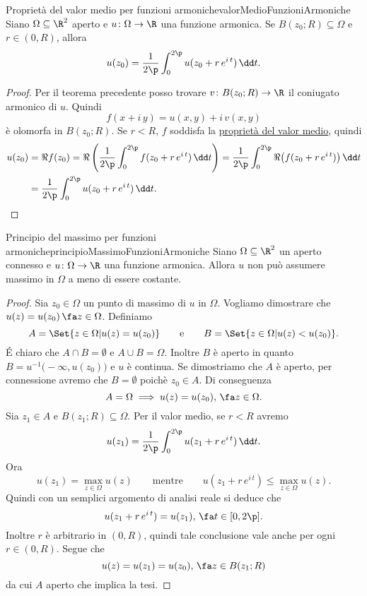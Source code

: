 \begin{prop}{Proprietà del valor medio per funzioni armoniche}{valorMedioFunzioniArmoniche}
	Siano \(\Omega\subseteq\R^2\) aperto e \(u\colon \Omega \to \R\) una funzione armonica.
	Se \(B(z_0;R)\subseteq\Omega\) e \(r\in (0,R)\), allora
	\[
		u(z_0) = \frac{1}{2\p} \int_0^{2\p} u(z_0+r\,e^{i\,t})\,\dd t.
	\]
\end{prop}

\begin{proof}
	Per il teorema precedente posso trovare \(v\colon B(z_0;R) \to \R\) il coniugato armonico di \(u\). Quindi
	\[
		f(x+i\,y) = u(x,y) + i\,v(x,y)
	\]
	è olomorfa in \(B(z_0;R)\). Se \(r<R\), \(f\) soddisfa la \hyperref[th:valorMedio]{proprietà del valor medio}, quindi
	\[
		\begin{split}
			u(z_0) & = \Re f(z_0) = \Re \left( \frac{1}{2\p} \int_0^{2\p} f(z_0+r\,e^{i\,t})\,\dd t \right) = \frac{1}{2\p}\int_0^{2\p} \Re\big(f(z_0+r\,e^{i\,t})\big)\,\dd t\\
			& = \frac{1}{2\p} \int_0^{2\p} u(z_0 + r\,e^{i\,t})\,\dd t.\qedhere
		\end{split}
	\]
\end{proof}

\begin{prop}{Principio del massimo per funzioni armoniche}{principioMassimoFunzioniArmoniche}
	Siano \(\Omega\subseteq\R^2\) un aperto connesso e \(u\colon \Omega \to \R\) una funzione armonica.
	Allora \(u\) non può assumere massimo in \(\Omega\) a meno di essere costante.
\end{prop}

\begin{proof}
	Sia \(z_0\in\Omega\) un punto di massimo di \(u\) in \(\Omega\). Vogliamo dimostrare che \(u(z)=u(z_0)\,\fa z\in\Omega\).
	Definiamo
	\[
		A = \Set{z\in\Omega | u(z)=u(z_0)} \qquad\text{e}\qquad B=\Set{z\in\Omega | u(z)<u(z_0)}.
	\]
	\'E chiaro che \(A\cap B = \emptyset\) e \(A\cup B=\Omega\).
	Inoltre \(B\) è aperto in quanto \(B=u^{-1}\big(-\infty,u(z_0)\big)\) e \(u\) è continua.
	Se dimostriamo che \(A\) è aperto, per connessione avremo che \(B=\emptyset\) poichè \(z_0\in A\). Di conseguenza
	\[
		A = \Omega \implies u(z) = u(z_0),\,\fa z\in \Omega.
	\]
	Sia \(z_1\in A\) e \(B(z_1;R)\subseteq \Omega\). Per il valor medio, se \(r<R\) avremo
	\[
		u(z_1) = \frac{1}{2\p} \int_0^{2\p} u(z_1+r\,e^{i\,t})\,\dd t.
	\]
	Ora
	\[
		u(z_1) = \max_{z\in \Omega} u(z) \qquad\text{mentre}\qquad u(z_1+r\,e^{i\,t}) \le \max_{z\in\Omega} u(z).
	\]
	Quindi con un semplici argomento di analisi reale si deduce che
	\[
		u(z_1+r\,e^{i\,t}) = u(z_1) ,\,\fa t\in [0,2\p].
	\]
	Inoltre \(r\) è arbitrario in \((0,R)\), quindi tale conclusione vale anche per ogni \(r\in(0,R)\). Segue che
	\[
		u(z) = u(z_1) = u(z_0),\,\fa z\in B(z_1;R)
	\]
	da cui \(A\) aperto che implica la tesi.
\end{proof}
